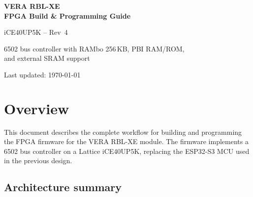 \documentclass[11pt,a4paper]{article}
\begin{document}

\begin{titlepage}
    \centering
    \vspace*{30mm}
    {\Huge\bfseries VERA RBL-XE\\[4mm]
     FPGA Build \& Programming Guide\par}
    \vspace{10mm}
    {\large iCE40UP5K -- Rev~4\par}
    \vspace{8mm}
    {\normalsize
        6502 bus controller with RAMbo 256\,KB, PBI RAM/ROM,\\
        and external SRAM support\par}
    \vfill
    {\small Last updated: \today\par}
\end{titlepage}

\tableofcontents
\newpage

\section{Overview}

This document describes the complete workflow for building and programming
the FPGA firmware for the VERA RBL-XE module.  The firmware implements a
6502 bus controller on a Lattice iCE40UP5K, replacing the ESP32-S3 MCU
used in the previous design.

\subsection{Architecture summary}
\end{document}
